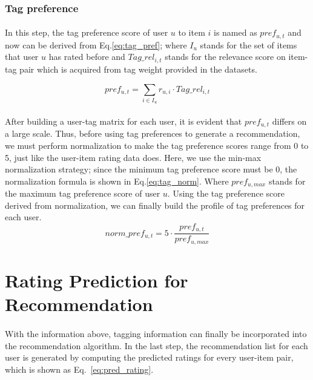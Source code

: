\documentclass[a4paper,12pt]{report}
\begin{document}
\subsubsection{Tag preference}
\paragraph{}
In this step, the tag preference score of user $u$ to item $i$ is named as $pref_{u,t}$ and now can be derived from Eq.\eqref{eq:tag_pref}; where $I_u$ stands for the set of items that user $u$ has rated before and $Tag\_rel_{i,t}$ stands for the relevance score on item-tag pair which is acquired from tag weight provided in the datasets.

\begin{equation}
    pref_{u,t}= \sum_{i\in I_u} r_{u,i} \cdot Tag\_rel_{i,t}
    \label{eq:tag_pref}
\end{equation}
\paragraph{}
After building a user-tag matrix for each user, it is evident that $pref_{u,t}$ differs on a large scale. Thus, before using tag preferences to generate a recommendation, we must perform normalization to make the tag preference scores range from 0 to 5, just like the user-item rating data does. Here, we use the min-max normalization strategy; since the minimum tag preference score must be 0, the normalization formula is shown in Eq.\eqref{eq:tag_norm}. Where $pref_{u,max}$ stands for the maximum tag preference score of user $u$. Using the tag preference score derived from normalization, we can finally build the profile of tag preferences for each user.
\begin{equation}
    norm\_pref_{u,t} = 5 \cdot \frac{pref_{u,t}}{pref_{u,max}}
    \label{eq:tag_norm}
\end{equation}

\section{Rating Prediction for Recommendation}
\paragraph{}
With the information above, tagging information can finally be incorporated into the recommendation algorithm. In the last step, the recommendation list for each user is generated by computing the predicted ratings for every user-item pair, which is shown as Eq.~\eqref{eq:pred_rating}.
\end{document}
